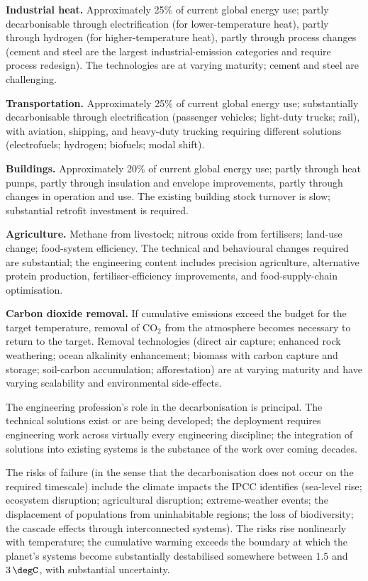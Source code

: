 \textbf{Industrial heat.} Approximately 25\% of current global energy use; partly decarbonisable through electrification (for lower-temperature heat), partly through hydrogen (for higher-temperature heat), partly through process changes (cement and steel are the largest industrial-emission categories and require process redesign). The technologies are at varying maturity; cement and steel are challenging.

\textbf{Transportation.} Approximately 25\% of current global energy use; substantially decarbonisable through electrification (passenger vehicles; light-duty trucks; rail), with aviation, shipping, and heavy-duty trucking requiring different solutions (electrofuels; hydrogen; biofuels; modal shift).

\textbf{Buildings.} Approximately 20\% of current global energy use; partly through heat pumps, partly through insulation and envelope improvements, partly through changes in operation and use. The existing building stock turnover is slow; substantial retrofit investment is required.

\textbf{Agriculture.} Methane from livestock; nitrous oxide from fertilisers; land-use change; food-system efficiency. The technical and behavioural changes required are substantial; the engineering content includes precision agriculture, alternative protein production, fertiliser-efficiency improvements, and food-supply-chain optimisation.

\textbf{Carbon dioxide removal.} If cumulative emissions exceed the budget for the target temperature, removal of CO$_2$ from the atmosphere becomes necessary to return to the target. Removal technologies (direct air capture; enhanced rock weathering; ocean alkalinity enhancement; biomass with carbon capture and storage; soil-carbon accumulation; afforestation) are at varying maturity and have varying scalability and environmental side-effects.

The engineering profession's role in the decarbonisation is principal. The technical solutions exist or are being developed; the deployment requires engineering work across virtually every engineering discipline; the integration of solutions into existing systems is the substance of the work over coming decades.

The risks of failure (in the sense that the decarbonisation does not occur on the required timescale) include the climate impacts the IPCC identifies (sea-level rise; ecosystem disruption; agricultural disruption; extreme-weather events; the displacement of populations from uninhabitable regions; the loss of biodiversity; the cascade effects through interconnected systems). The risks rise nonlinearly with temperature; the cumulative warming exceeds the boundary at which the planet's systems become substantially destabilised somewhere between $1.5$ and $3\,\degC$, with substantial uncertainty.

